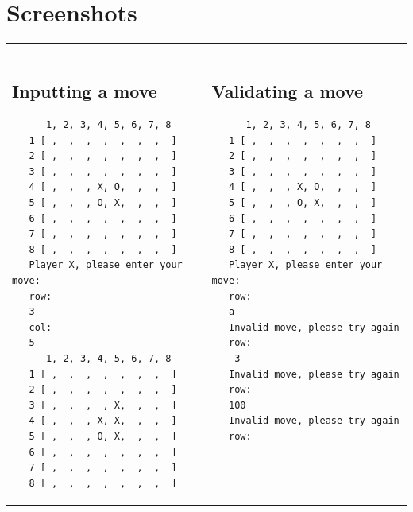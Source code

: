 \documentclass[a4wide, 11pt]{article}
\begin{document}
  \section{Screenshots}
  \begin{center}
    \begin{tabular}{ | l | l |}
      \toprule
      \hline
      \begin{minipage}{85mm}
      \tiny{\begin{verbatim} \end{verbatim}}
      \subsection{Inputting a move}
        \begin{scriptsize}
          \begin{verbatim}
      1, 2, 3, 4, 5, 6, 7, 8 
   1 [ ,  ,  ,  ,  ,  ,  ,  ]
   2 [ ,  ,  ,  ,  ,  ,  ,  ]
   3 [ ,  ,  ,  ,  ,  ,  ,  ]
   4 [ ,  ,  , X, O,  ,  ,  ]
   5 [ ,  ,  , O, X,  ,  ,  ]
   6 [ ,  ,  ,  ,  ,  ,  ,  ]
   7 [ ,  ,  ,  ,  ,  ,  ,  ]
   8 [ ,  ,  ,  ,  ,  ,  ,  ]
   Player X, please enter your move:
   row: 
   3
   col: 
   5
      1, 2, 3, 4, 5, 6, 7, 8 
   1 [ ,  ,  ,  ,  ,  ,  ,  ]
   2 [ ,  ,  ,  ,  ,  ,  ,  ]
   3 [ ,  ,  ,  , X,  ,  ,  ]
   4 [ ,  ,  , X, X,  ,  ,  ]
   5 [ ,  ,  , O, X,  ,  ,  ]
   6 [ ,  ,  ,  ,  ,  ,  ,  ]
   7 [ ,  ,  ,  ,  ,  ,  ,  ]
   8 [ ,  ,  ,  ,  ,  ,  ,  ]
          \end{verbatim}
        \end{scriptsize}
      \end{minipage}
      &
      \begin{minipage}{85mm}
      \tiny{\begin{verbatim} \end{verbatim}}
      \subsection{Validating a move}
        \begin{scriptsize}
          \begin{verbatim}
      1, 2, 3, 4, 5, 6, 7, 8 
   1 [ ,  ,  ,  ,  ,  ,  ,  ]
   2 [ ,  ,  ,  ,  ,  ,  ,  ]
   3 [ ,  ,  ,  ,  ,  ,  ,  ]
   4 [ ,  ,  , X, O,  ,  ,  ]
   5 [ ,  ,  , O, X,  ,  ,  ]
   6 [ ,  ,  ,  ,  ,  ,  ,  ]
   7 [ ,  ,  ,  ,  ,  ,  ,  ]
   8 [ ,  ,  ,  ,  ,  ,  ,  ]
   Player X, please enter your move:
   row: 
   a
   Invalid move, please try again
   row: 
   -3
   Invalid move, please try again
   row: 
   100
   Invalid move, please try again
   row: 




\end{verbatim}
\end{scriptsize}
\end{minipage}
\end{tabular}
\end{center}
\end{document}
